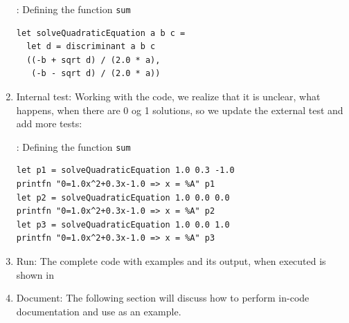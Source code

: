 \documentclass[fsharpNotes.tex]{subfiles}
\begin{document}
\begin{enumerate}
\begin{codeNOutput}[label=solveQuadraticEquationImplementation,
  top=-5pt,
  bottom=-5pt,
  left=-2pt,
  right=-2pt,
]{: Defining the function \lstinline{sum}}
\begin{lstlisting}
let solveQuadraticEquation a b c =
  let d = discriminant a b c
  ((-b + sqrt d) / (2.0 * a),
   (-b - sqrt d) / (2.0 * a))
\end{lstlisting}
\end{codeNOutput}
\item Internal test: Working with the code, we realize that it is unclear, what happens, when there are 0 og 1 solutions, so we update the external test and add more tests:
\begin{codeNOutput}[label=solveQuadraticEquationTest2,
  top=-5pt,
  bottom=-5pt,
  left=-2pt,
  right=-2pt,
]{: Defining the function \lstinline{sum}}
\begin{lstlisting}
let p1 = solveQuadraticEquation 1.0 0.3 -1.0
printfn "0=1.0x^2+0.3x-1.0 => x = %A" p1
let p2 = solveQuadraticEquation 1.0 0.0 0.0
printfn "0=1.0x^2+0.3x-1.0 => x = %A" p2
let p3 = solveQuadraticEquation 1.0 0.0 1.0
printfn "0=1.0x^2+0.3x-1.0 => x = %A" p3
\end{lstlisting} 
\end{codeNOutput}
\item Run: The complete code with examples and its output, when executed is shown in 
\item Document: The following section will discuss how to perform in-code documentation and use  as an example.
\end{enumerate}
\end{document}

